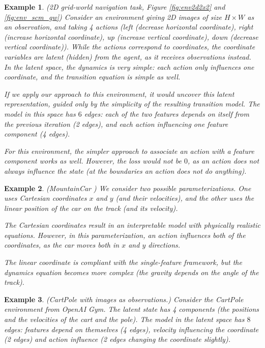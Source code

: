 \documentclass[a4paper,11pt,oneside]{report}
\newtheorem{example}{Example}[section]
\begin{document}
\begin{example}{(2D grid-world navigation task, Figure \ref{fig:env2d2x2} and \ref{fig:env_scm_gw})}
    Consider an environment giving 2D images of size $H\times W$ as an observation, and taking 4 actions (left (decrease horizontal coordinate), right (increase horizontal coordinate), up (increase vertical coordinate), down (decrease vertical coordinate)). While the actions correspond to coordinates, the coordinate variables are latent (hidden) from the agent, as it receives observations instead. In the latent space, the dynamics is very simple: each action only influences one coordinate, and the transition equation is simple as well.

    If we apply our approach to this environment, it would uncover this latent representation, guided only by the simplicity of the resulting transition model.
    The model in this space has $6$ edges: each of the two features depends on itself from the previous iteration (2 edges), and each action influencing one feature component (4 edges).

    For this environment, the simpler approach to associate an action with a feature component works as well. However, the loss would not be $0$, as an action does not always influence the state (at the boundaries an action does not do anything). %
\end{example}

\begin{example}{(MountainCar \cite{brockman2016openai})}
    We consider two possible parameterizations. One uses Cartesian coordinates $x$ and $y$ (and their velocities), and the other uses the linear position of the car on the track (and its velocity).

    The Cartesian coordinates result in an interpretable model with physically realistic equations. However, in this parameterization, an action influences both of the coordinates, as the car moves both in $x$ and $y$ directions.

    The linear coordinate is compliant with the single-feature framework, but the dynamics equation becomes more complex (the gravity depends on the angle of the track).
\end{example}


\begin{example}{(CartPole \cite{brockman2016openai} with images as observations.)}
    Consider the CartPole environment from OpenAI Gym. The latent state has 4 components (the positions and the velocities of the cart and the pole).
    The model in the latent space has $8$ edges: features depend on themselves (4 edges), velocity influencing the coordinate (2 edges) and action influence (2 edges changing the coordinate slightly).
\end{example}
\end{document}
